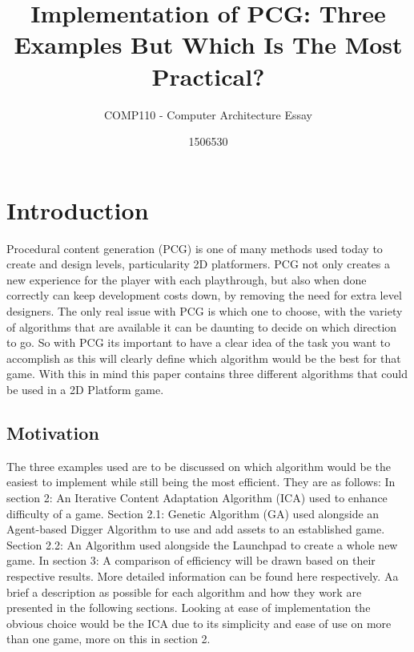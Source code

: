 \documentclass{scrartcl}
\title{Implementation of PCG: Three Examples But Which Is The Most Practical?}
\subtitle{COMP110 - Computer Architecture Essay}
\author{1506530}
\begin{document}
\maketitle


\section{Introduction}

Procedural content generation (PCG) is one of many methods used today to create and design levels, particularity 2D platformers. PCG not only creates a new experience for the player with each playthrough, but also when done correctly can keep development costs down, by removing the need for extra level designers\cite{walaa}. The only real issue with PCG is which one to choose, with the variety of algorithms that are available it can be daunting to decide on which direction to go. So with PCG its important to have a clear idea of the task you want to accomplish as this will clearly define which algorithm would be the best for that game. With this in mind this paper contains three different algorithms that could be used in a 2D Platform game. 

\subsection{Motivation}
The three examples used are to be discussed on which algorithm would be the easiest to implement while still being the most efficient. They are as follows:
\newline 
In section 2: An Iterative Content Adaptation Algorithm (ICA) used to enhance difficulty of a game\cite{fausto}.
\newline
Section 2.1: Genetic Algorithm (GA) used alongside an Agent-based Digger Algorithm to use and add assets to an established game\cite{walaa}.
\newline
Section 2.2: An Algorithm used alongside the Launchpad to create a whole new game\cite{web}.
\newline
In section 3: A comparison of efficiency will be drawn based on their respective results.
\newline
More detailed information can be found here \cite{fausto,walaa,web} respectively. Aa brief a description as possible for each algorithm and how they work are presented in the following sections. Looking at ease of implementation the obvious choice would be the ICA due to its simplicity and ease of use on more than one game, more on this in section 2.
\end{document}
